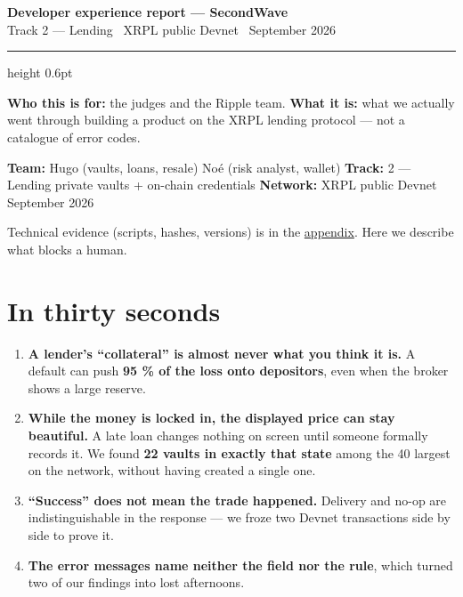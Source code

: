 \documentclass[10pt,a4paper]{article}
\begin{document}
\begin{center}
{\LARGE\bfseries Developer experience report --- SecondWave}\\[3pt]
{\large Track 2 --- Lending \textperiodcentered\ XRPL public Devnet \textperiodcentered\ September 2026}
\end{center}
\vspace{3pt}
{\color{rule}\hrule height 0.6pt}
\vspace{6pt}


\textbf{Who this is for:} the judges and the Ripple team.
\textbf{What it is:} what we actually went through building a product on the XRPL lending protocol --- not a catalogue of error codes.

\textbf{Team:} Hugo (vaults, loans, resale) \textperiodcentered{} Noé (risk analyst, wallet)
\textbf{Track:} 2 --- Lending \textperiodcentered{} private vaults + on-chain credentials
\textbf{Network:} XRPL public Devnet \textperiodcentered{} September 2026

Technical evidence (scripts, hashes, versions) is in the \href{\#where-the-proofs-are}{appendix}. Here we describe what blocks a human.

\vspace{4pt}

\section*{In thirty seconds}

\begin{enumerate}
  \item \textbf{A lender's ``collateral'' is almost never what you think it is.} A default can push \textbf{95 \% of the loss onto depositors}, even when the broker shows a large reserve.
  \item \textbf{While the money is locked in, the displayed price can stay beautiful.} A late loan changes nothing on screen until someone formally records it. We found \textbf{22 vaults in exactly that state} among the 40 largest on the network, without having created a single one.
  \item \textbf{``Success'' does not mean the trade happened.} Delivery and no-op are indistinguishable in the response --- we froze two Devnet transactions side by side to prove it.
  \item \textbf{The error messages name neither the field nor the rule}, which turned two of our findings into lost afternoons.
\end{enumerate}
\end{document}
